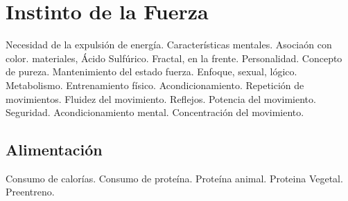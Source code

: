 \chapter*{Instinto de la Fuerza}
Necesidad de la expulsión de energía.
Características mentales. Asociaón con color. materiales, Ácido Sulfúrico. Fractal, en la frente.
Personalidad. 
Concepto de pureza.
Mantenimiento del estado fuerza.
Enfoque, sexual, lógico.
Metabolismo.
Entrenamiento físico. Acondicionamiento. Repetición de movimientos.
Fluidez del movimiento.
Reflejos. Potencia del movimiento. Seguridad. Acondicionamiento mental.
Concentración del movimiento.
\section*{Alimentación}
Consumo de calorías.
Consumo de proteína. Proteína animal. Proteina Vegetal.
Preentreno.
\\
